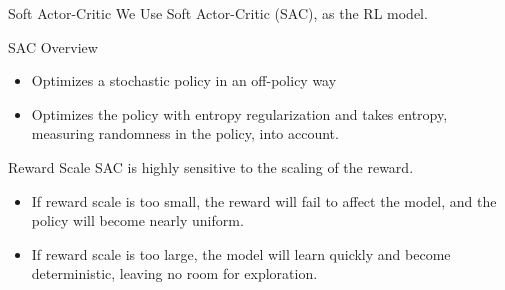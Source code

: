 \begin{frame}{Soft Actor-Critic}
We Use Soft Actor-Critic (SAC), as the RL model.
\begin{block}{SAC Overview}
\begin{itemize}
    \item Optimizes a stochastic policy in an off-policy way
    \item Optimizes the policy with \alert{entropy regularization} and takes entropy, measuring randomness in the policy, into account.
\end{itemize}
\end{block}
\begin{alertblock}{Reward Scale}
SAC is highly sensitive to the scaling of the reward. 
\begin{itemize}
    \item If reward scale is too small, the reward will fail to affect the model, and the policy will become nearly uniform.
    \item If reward scale is too large, the model will learn quickly and become deterministic, leaving no room for exploration.
\end{itemize}
\end{alertblock}
\end{frame}